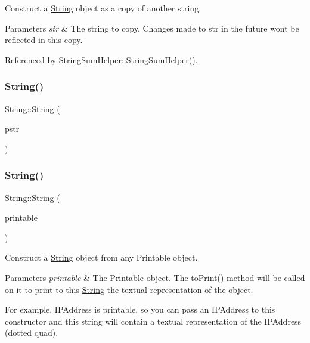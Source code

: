 Construct a \hyperlink{class_string}{String} object as a copy of another string. 


\begin{DoxyParams}{Parameters}
{\em str} & The string to copy. Changes made to str in the future won\textquotesingle{}t be reflected in this copy. \\
\hline
\end{DoxyParams}


Referenced by String\+Sum\+Helper\+::\+String\+Sum\+Helper().

\mbox{\label{class_string_a8c89c89e3cb69407bf55443c3d9dce0c}} 
\subsubsection{\texorpdfstring{String()}{String()}\hspace{0.1cm}{\footnotesize\ttfamily [4/13]}}
{\footnotesize\ttfamily String\+::\+String (\begin{DoxyParamCaption}\item[{const \+\_\+\+\_\+\+Flash\+String\+Helper $\ast$}]{pstr }\end{DoxyParamCaption})}

\mbox{\label{class_string_ad61d0ac2a1ff6e81fc7da8097be3c4dd}} 
\subsubsection{\texorpdfstring{String()}{String()}\hspace{0.1cm}{\footnotesize\ttfamily [5/13]}}
{\footnotesize\ttfamily String\+::\+String (\begin{DoxyParamCaption}\item[{const Printable \&}]{printable }\end{DoxyParamCaption})}



Construct a \hyperlink{class_string}{String} object from any Printable object. 


\begin{DoxyParams}{Parameters}
{\em printable} & The Printable object. The to\+Print() method will be called on it to print to this \hyperlink{class_string}{String} the textual representation of the object.\\
\hline
\end{DoxyParams}
For example, I\+P\+Address is printable, so you can pass an I\+P\+Address to this constructor and this string will contain a textual representation of the I\+P\+Address (dotted quad). \mbox{\label{class_string_a1fdfe981d2c5e0075c1669dd94553082}} 
